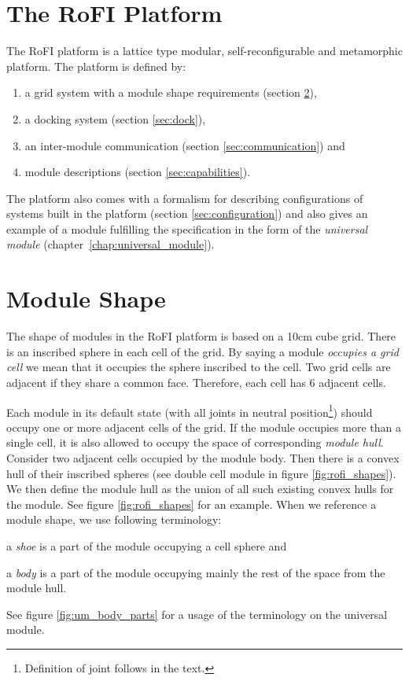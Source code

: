 \section{The RoFI Platform }

The RoFI platform is a lattice type modular, self-reconfigurable and metamorphic
platform. The platform is defined by:
\begin{enumerate}
    \item a grid system with a module shape requirements (section \ref{sec:aware}),
    \item a docking system (section \ref{sec:dock}),
    \item an inter-module communication (section \ref{sec:communication}) and
    \item module descriptions (section \ref{sec:capabilities}).
\end{enumerate}

The platform also comes with a formalism for describing configurations of
systems built in the platform (section \ref{sec:configuration}) and also gives
an example of a module fulfilling the specification in the form of the
\emph{universal module} (chapter~\ref{chap:universal_module}).

\section{Module Shape}\label{sec:aware}

The shape of modules in the RoFI platform is based on a 10cm cube grid. There is
an inscribed sphere in each cell of the grid. By saying a module \emph{occupies
a grid cell} we mean that it occupies the sphere inscribed to the cell. Two grid
cells are adjacent if they share a common face. Therefore, each cell has 6
adjacent cells.

Each module in its default state (with all joints in neutral
position\footnote{Definition of joint follows in the text.}) should occupy one
or more adjacent cells of the grid. If the module occupies more than a single
cell, it is also allowed to occupy the space of corresponding \emph{module
hull}. Consider two adjacent cells occupied by the module body. Then there is a
convex hull of their inscribed spheres (see double cell module in figure
\ref{fig:rofi_shapes}). We then define the module hull as the union of all such
existing convex hulls for the module. See figure \ref{fig:rofi_shapes} for an
example. When we reference a module shape, we use following terminology:
\begin{enumerate*}
    \item a \emph{shoe} is a part of the module occupying a cell sphere and
    \item a \emph{body} is a part of the module occupying mainly the rest of the
    space from the module hull.
\end{enumerate*}
See figure \ref{fig:um_body_parts} for a usage of the terminology on the
universal module.

